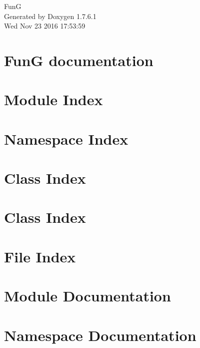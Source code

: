 \documentclass[a4paper]{book}
\begin{document}
\hypersetup{pageanchor=false,citecolor=blue}
\begin{titlepage}
\vspace*{7cm}
\begin{center}
{\Large \-Fun\-G }\\
\vspace*{1cm}
{\large \-Generated by Doxygen 1.7.6.1}\\
\vspace*{0.5cm}
{\small Wed Nov 23 2016 17:53:59}\\
\end{center}
\end{titlepage}
\clearemptydoublepage
{}
\tableofcontents
\clearemptydoublepage
{}
\hypersetup{pageanchor=true,citecolor=blue}
\chapter{\-Fun\-G documentation}
\label{index}\hypertarget{index}{}
\chapter{\-Module \-Index}

\chapter{\-Namespace \-Index}

\chapter{\-Class \-Index}

\chapter{\-Class \-Index}

\chapter{\-File \-Index}

\chapter{\-Module \-Documentation}










\chapter{\-Namespace \-Documentation}











\end{document}
